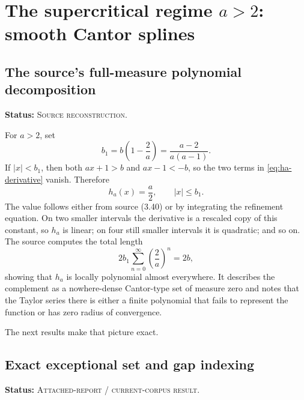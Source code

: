 \documentclass[11pt,oneside]{article}
\theoremstyle{definition}
\theoremstyle{remark}
\newcommand{\SourceStatus}{\textcolor{SourceBlue}{\textsc{Source reconstruction}}}
\newcommand{\DraftStatus}{\textcolor{DraftAmber}{\textsc{Attached-report / current-corpus result}}}
\newcommand{\status}[1]{\par\smallskip\noindent\textbf{Status:} #1.\par\smallskip}
\begin{document}
\section{The supercritical regime \texorpdfstring{\(a>2\)}{a>2}: smooth Cantor splines}
\label{sec:supercritical}

\subsection{The source's full-measure polynomial decomposition}
\status{\SourceStatus}

For \(a>2\), set
\begin{equation}
  b_1=b\left(1-\frac2a\right)
      =\frac{a-2}{a(a-1)}.
  \label{eq:b1}
\end{equation}
If \(|x|<b_1\), then both \(ax+1>b\) and \(ax-1<-b\), so the two terms in \eqref{eq:ha-derivative} vanish.  Therefore
\begin{equation}
  h_a(x)=\frac a2,
  \qquad |x|\le b_1.
  \label{eq:central-plateau}
\end{equation}
The value follows either from source (3.40) or by integrating the refinement equation.  On two smaller intervals the derivative is a rescaled copy of this constant, so \(h_a\) is linear; on four still smaller intervals it is quadratic; and so on.  The source computes the total length
\begin{equation}
  2b_1\sum_{n=0}^{\infty}\left(\frac2a\right)^n=2b,
  \label{eq:full-measure-polynomial}
\end{equation}
showing that \(h_a\) is locally polynomial almost everywhere.  It describes the complement as a nowhere-dense Cantor-type set of measure zero and notes that the Taylor series there is either a finite polynomial that fails to represent the function or has zero radius of convergence.

The next results make that picture exact.

\subsection{Exact exceptional set and gap indexing}
\status{\DraftStatus}
\end{document}
